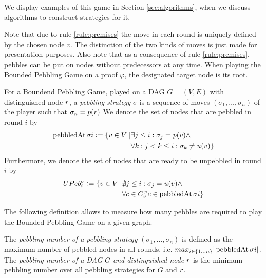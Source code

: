 We display examples of this game in Section \ref{sec:algorithms}, when we discuss algorithms to construct strategies for it.

Note that due to rule \ref{rule:premises} the move in each round is uniquely defined by the chosen node $v$.
The distinction of the two kinds of moves is just made for presentation purposes.
Also note that as a consequence of rule \ref{rule:premises}, pebbles can be put on nodes without predecessors at any time.
When playing the Bounded Pebbling Game on a proof $\varphi$, the designated target node is its root.

\begin{definition}[Strategy]
\label{def:strategy}
For a Boundend Pebbling Game, played on a DAG $G = (V,E)$ with distinguished node $r$, 
a \emph{pebbling strategy} $\sigma$ is a sequence of moves $(\sigma_1,\ldots,\sigma_n)$ of the player such that $\sigma_n = p(r)$
We denote the set of nodes that are pebbled in round $i$ by 
\begin{align*}
	\operatorname{pebbledAt}{\sigma}{i} \mathrel{\mathop:}= \{ v \in V \mid	& \exists j \leq i: \sigma_j = p(v) \wedge\\
																								&\forall k: j < k \leq i: \sigma_k \neq u(v)\}
\end{align*}
Furthermore, we denote the set of nodes that are ready to be unpebbled in round $i$ by
\begin{align*}
	UPeb^{\sigma}_{i} \mathrel{\mathop:}= \{ v \in V \mid	& \nexists j \leq i: \sigma_j = u(v) \wedge\\
																									& \forall c \in C_{v}^{\varphi} c \in \operatorname{pebbledAt}{\sigma}{i}\}
\end{align*}

\end{definition}

The following definition allows to measure how many pebbles are required to play the Bounded Pebbling Game on a given graph.

\begin{definition}
The \emph{pebbling number of a pebbling strategy} $(\sigma_1,\ldots,\sigma_n)$ is defined as the maximum number of pebbled nodes in all rounds, 
i.e. $max_{i \scriptstyle \in \{1\ldots n\} \displaystyle}|\operatorname{pebbledAt}{\sigma}{i}|$.
The \emph{pebbling number of a DAG $G$ and distinguished node $r$} is the minimum pebbling number over all pebbling strategies for $G$ and $r$.
\end{definition}

